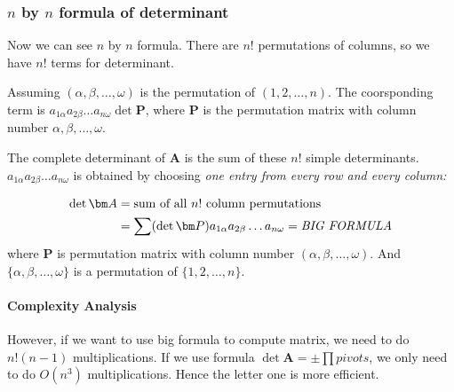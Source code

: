 \subsubsection{$n$ by $n$ formula of determinant}
Now we can see $n$ by $n$ formula. There are $n!$ permutations of columns, so we have $n!$ terms for determinant. 

Assuming $(\alpha,\beta,\dots,\omega)$ is the permutation of $(1,2,\dots,n)$. The coorsponding term is $a_{1\alpha}a_{2\beta}\dots a_{n\omega}\det\bm P$, where $\bm P$ is the permutation matrix with column number $\alpha,\beta,\dots,\omega$.

The complete determinant of $\bm A$ is the sum of these $n!$ simple determinants. $a_{1\alpha}a_{2\beta}\dots a_{n\omega}$ is obtained by choosing \emph{one entry from every row and every column:}
\begin{definition}
\[
\begin{aligned}
\det\bm A&=\text{sum of all $n!$ column permutations}\\
&=\sum(\det\bm P)a_{1\alpha}a_{2\beta}\dots a_{n\omega}=\text{\emph{BIG FORMULA}}
\end{aligned}
\]
where $\bm P$ is permutation matrix with column number $(\alpha,\beta,\dots,\omega)$. And $\{\alpha,\beta,\dots,\omega\}$ is a permutation of $\{1,2,\dots,n\}$.
\end{definition}
\begin{remark}
\paragraph{Complexity Analysis}
However, if we want to use big formula to compute matrix, we need to do $n!(n-1)$ multiplications. If we use formula $\det\bm A=\pm\prod pivots$, we only need to do $O(n^3)$ multiplications. Hence the letter one is more efficient.
\end{remark}
